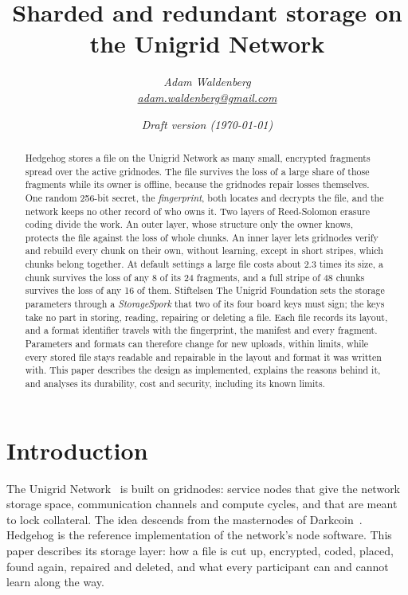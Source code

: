 \documentclass[10pt,a4paper,final]{article}
\author{\textit{Adam Waldenberg\\\href{mailto:adam.waldenberg@gmail.com}{adam.waldenberg@gmail.com}}}
\affil{Stiftelsen The Unigrid Foundation\\\href{http://www.unigrid.org}{www.unigrid.org}}
\title{Sharded and redundant storage on the Unigrid Network}
\date{\emph{Draft version (\today)}}
\begin{document}
\maketitle

\begin{abstract}
Hedgehog stores a file on the Unigrid Network as many small, encrypted fragments spread over the active
gridnodes. The file survives the loss of a large share of those fragments while its owner is offline, because the
gridnodes repair losses themselves. One random 256-bit secret, the \emph{fingerprint}, both locates and decrypts
the file, and the network keeps no other record of who owns it. Two layers of Reed-Solomon erasure coding divide
the work. An outer layer, whose structure only the owner knows, protects the file against the loss of whole chunks.
An inner layer lets gridnodes verify and rebuild every chunk on their own, without learning, except in short
stripes, which chunks belong together. At default settings a large file costs about 2.3 times its size, a chunk
survives the loss of any 8 of its 24 fragments, and a full stripe of 48 chunks survives the loss of any 16 of them.
Stiftelsen The Unigrid Foundation sets the storage parameters through a \emph{StorageSpork} that two of its four
board keys must sign; the keys take no part in storing, reading, repairing or deleting a file. Each file records its
layout, and a format identifier travels with the fingerprint, the manifest and every fragment. Parameters and formats
can therefore change for new uploads, within limits, while every stored file stays readable and repairable in the
layout and format it was written with. This paper describes the design as
implemented, explains the reasons behind it, and analyses its durability, cost and security, including its known
limits.
\end{abstract}

\tableofcontents

\section{Introduction}
\label{sec:intro}

The Unigrid Network~\cite{unigrid-whitepaper} is built on gridnodes: service nodes that give the network storage
space, communication channels and compute cycles, and that are meant to lock collateral. The idea descends from the
masternodes of Darkcoin~\cite{darkcoin2014}. Hedgehog is the reference implementation of the network's node
software. This paper describes its storage layer: how a file is cut up, encrypted, coded, placed, found again,
repaired and deleted, and what every participant can and cannot learn along the way.
\end{document}
